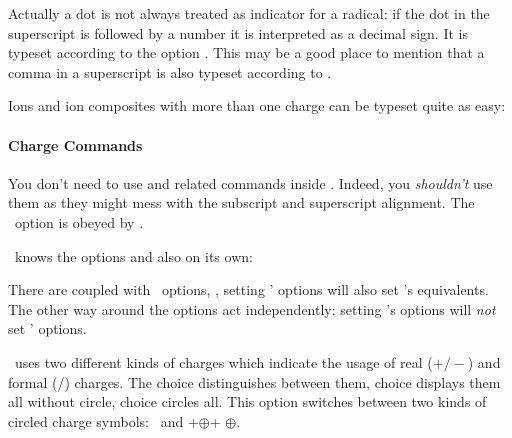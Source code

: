 \documentclass[load-preamble+]{cnltx-doc}
\begin{document}
Actually a dot  is not always treated as
indicator for a radical: if the dot in the superscript is followed by a number
it is interpreted as a decimal sign.  It is typeset according to the option
.  This may be a good place to mention that a comma
\code{,} in a superscript is also typeset according to
.

\begin{example}
  \par
\end{example}

Ions and ion composites with more than one charge can be typeset quite as
easy:
\begin{example}
   
\end{example}

\paragraph{Charge Commands}
You don't need to use  and related commands inside .  Indeed,
you \emph{shouldn't} use them as they might mess with the subscript and
superscript alignment.  The \chemmacros\ option  is obeyed by
.
\begin{example}
\end{example}

\chemformula\ knows the options  and  also
on its own:

There are coupled with \chemmacros\ options, \ie, setting \chemmacros'
options will also set \chemformula's equivalents.  The other way around the
options act independently: setting \chemformula's options will \emph{not} set
\chemmacros' options.
\begin{options}
    \chemformula\ uses two different kinds of charges which indicate the usage
    of real ($+/-$) and formal (\fplus/\fminus) charges.  The choice
     distinguishes between them, choice  displays them
    all without circle, choice  circles all.
    This option switches between two kinds of circled charge symbols:
     \fplus\ and \verbcode+$\oplus$+ $\oplus$.
\end{options}
\end{document}
